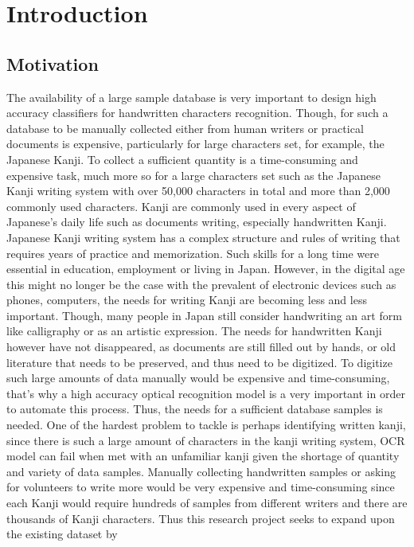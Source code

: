 \documentclass[12pt]{report}
\begin{document}
\newpage
{}
\listoffigures

\newpage
{}
\setcounter{page}{1}
\chapter{Introduction}
\label{chap:intro}

\section{Motivation}
The availability of a large sample database is very important to design high accuracy
classifiers for handwritten characters recognition. Though, for such a database to be manually collected either from human writers or practical documents is expensive, particularly for large characters set, for example, the Japanese Kanji. To
collect a sufficient quantity is a time-consuming and expensive task, much more so
for a large characters set such as the Japanese Kanji writing system with over 50,000
characters in total and more than 2,000 commonly used characters. Kanji are
commonly used in every aspect of Japanese’s daily life such as documents writing,
especially handwritten Kanji.
Japanese Kanji writing system has a complex structure and rules of writing that
requires years of practice and memorization. Such skills for a long time were
essential in education, employment or living in Japan. However, in the digital age
this might no longer be the case with the prevalent of electronic devices such as
phones, computers, the needs for writing Kanji are becoming less and less important.
Though, many people in Japan still consider handwriting an art form like calligraphy
or as an artistic expression. The needs for handwritten Kanji however have not
disappeared, as documents are still filled out by hands, or old literature that needs to be preserved, and thus need to be digitized. To digitize such large amounts of data manually would be expensive and time-consuming, that’s
why a high accuracy optical recognition model is a very important in order to
automate this process. Thus, the needs for a sufficient database samples is needed.
One of the hardest problem to tackle is perhaps identifying written kanji, since there
is such a large amount of characters in the kanji writing system, OCR model can fail
when met with an unfamiliar kanji given the shortage of quantity and variety of data
samples. Manually collecting handwritten samples or asking for volunteers to write more would be very expensive and time-consuming since each Kanji would require hundreds of samples from different writers and there are thousands of Kanji characters. Thus this research project seeks to expand upon the existing dataset by
\end{document}
